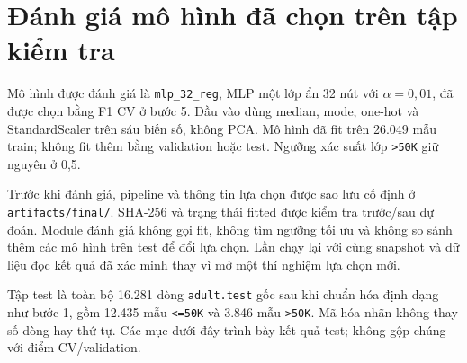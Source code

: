 \section{Đánh giá mô hình đã chọn trên tập kiểm tra}
\label{sec:6_5}
Mô hình được đánh giá là \texttt{mlp\_32\_reg}, MLP một lớp ẩn 32 nút với $\alpha=0{,}01$, đã được chọn bằng F1 CV ở bước 5. Đầu vào dùng median, mode, one-hot và StandardScaler trên sáu biến số, không PCA. Mô hình đã fit trên 26.049 mẫu train; không fit thêm bằng validation hoặc test. Ngưỡng xác suất lớp \texttt{>50K} giữ nguyên ở 0,5.

Trước khi đánh giá, pipeline và thông tin lựa chọn được sao lưu cố định ở \texttt{artifacts/final/}. SHA-256 và trạng thái fitted được kiểm tra trước/sau dự đoán. Module đánh giá không gọi fit, không tìm ngưỡng tối ưu và không so sánh thêm các mô hình trên test để đổi lựa chọn. Lần chạy lại với cùng snapshot và dữ liệu đọc kết quả đã xác minh thay vì mở một thí nghiệm lựa chọn mới.

Tập test là toàn bộ 16.281 dòng \texttt{adult.test} gốc sau khi chuẩn hóa định dạng như bước 1, gồm 12.435 mẫu \texttt{<=50K} và 3.846 mẫu \texttt{>50K}. Mã hóa nhãn không thay số dòng hay thứ tự. Các mục dưới đây trình bày kết quả test; không gộp chúng với điểm CV/validation.




